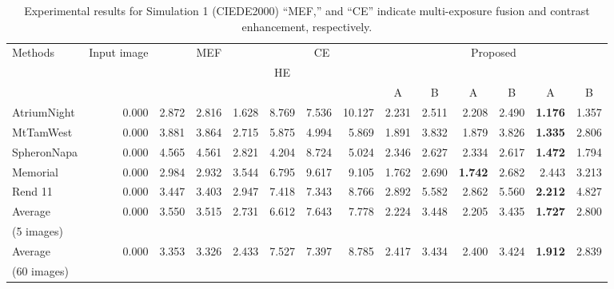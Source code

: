 \documentclass[paper]{ieice}
\begin{document}
%
\begin{table*}[!t]
  \centering
  \caption{Experimental results for Simulation 1 (CIEDE2000)
  ``MEF,'' and ``CE'' indicate
  multi-exposure fusion and contrast enhancement, respectively.}
  {\small
  \begin{tabular}{l|r|rrr|rrr|rr|rr|rr} \hline \hline
    \multirow{3}{*}{Methods} & \multirow{3}{10mm}{Input image} & \multicolumn{3}{c|}{MEF} &
    \multicolumn{3}{c|}{CE} & \multicolumn{6}{c}{Proposed}\\\cline{3-14}
    & & \multicolumn{1}{c}{\cite{mertens2009exposure}} &
    \multicolumn{1}{c}{\cite{sakai2015hybrid}} & \multicolumn{1}{c|}{\cite{nejati2017fast}} &
    \multicolumn{1}{c}{HE} & \multicolumn{1}{c}{\cite{zuiderveld1994contrast}} &
    \multicolumn{1}{c|}{\cite{wu2017contrast}} &
    \multicolumn{2}{c|}{\cite{mertens2009exposure}} &
    \multicolumn{2}{c|}{\cite{sakai2015hybrid}} &
    \multicolumn{2}{c}{\cite{nejati2017fast}}\\
    &&&&&&&& \multicolumn{1}{c}{A} & \multicolumn{1}{c|}{B} &
    \multicolumn{1}{c}{A} & \multicolumn{1}{c|}{B} & \multicolumn{1}{c}{A} &
    \multicolumn{1}{c}{B}\\
    \hdashline
AtriumNight & 0.000 & 2.872 & 2.816 & 1.628 & 8.769 & 7.536 & 10.127 & 2.231 & 2.511 & 2.208 & 2.490 & \textbf{1.176} & 1.357 \\
MtTamWest & 0.000 & 3.881 & 3.864 & 2.715 & 5.875 & 4.994 & 5.869 & 1.891 & 3.832 & 1.879 & 3.826 & \textbf{1.335} & 2.806 \\
SpheronNapa & 0.000 & 4.565 & 4.561 & 2.821 & 4.204 & 8.724 & 5.024 & 2.346 & 2.627 & 2.334 & 2.617 & \textbf{1.472} & 1.794 \\
Memorial & 0.000 & 2.984 & 2.932 & 3.544 & 6.795 & 9.617 & 9.105 & 1.762 & 2.690 & \textbf{1.742} & 2.682 & 2.443 & 3.213 \\
Rend 11 & 0.000 & 3.447 & 3.403 & 2.947 & 7.418 & 7.343 & 8.766 & 2.892 & 5.582 & 2.862 & 5.560 & \textbf{2.212} & 4.827 \\\hdashline
Average & \multirow{2}{*}{0.000} & \multirow{2}{*}{3.550} & \multirow{2}{*}{3.515} & \multirow{2}{*}{2.731} & \multirow{2}{*}{6.612} & \multirow{2}{*}{7.643} & \multirow{2}{*}{7.778} & \multirow{2}{*}{2.224} & \multirow{2}{*}{3.448} & \multirow{2}{*}{2.205} & \multirow{2}{*}{3.435} & \multirow{2}{*}{\textbf{1.727}} & \multirow{2}{*}{2.800} \\
(5 images) &  &  &  &  &  &  &  &  &  &  &  &  &  \\\hdashline
Average & \multirow{2}{*}{0.000} & \multirow{2}{*}{3.353} & \multirow{2}{*}{3.326} & \multirow{2}{*}{2.433} & \multirow{2}{*}{7.527} & \multirow{2}{*}{7.397} & \multirow{2}{*}{8.785} & \multirow{2}{*}{2.417} & \multirow{2}{*}{3.434} & \multirow{2}{*}{2.400} & \multirow{2}{*}{3.424} & \multirow{2}{*}{\textbf{1.912}} & \multirow{2}{*}{2.839} \\
(60 images) &  &  &  &  &  &  &  &  &  &  &  &  & \\\hline
  \end{tabular}
  }
  \label{tab:HDRCIEDE}
\end{table*}
\end{document}
